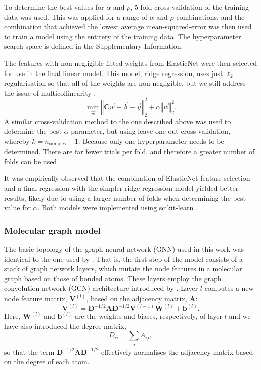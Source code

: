 To determine the best values for $\alpha$ and $\rho$, 5-fold cross-validation of
the training data was used. This was applied for a range of $\alpha$ and $\rho$
combinations, and the combination that achieved the lowest average
mean-squared-error was then used to train a model using the entirety of the
training data. The hyperparameter search space is defined in the Supplementary
Information.

The features with non-negligible fitted weights from ElasticNet were then selected for use in the final linear model. This model, ridge regression, uses just $\ell_2$ regularisation so that all of the weights are non-negligible, but we
still address the issue of multicollinearity \cite{mcdonaldRidgeRegression2009}:
\begin{equation}
    \min_{\vec{w}} \left \Vert \mathbf{C} \vec{w} + \vec{b} - \vec{y} \right \Vert_2^2 + \alpha \left \Vert \vec{w}\right \Vert_2^2.
\end{equation}
A similar cross-validation method to the one described above was used to determine the best $\alpha$ parameter, but using leave-one-out cross-validation, whereby $k=n_\text{samples}-1$. Because only one hyperparameter needs to be determined. There are far fewer trials per
fold, and therefore a greater number of folds can be used.

It was empirically observed that the combination of ElasticNet feature selection and a final regression with the simpler ridge regression model yielded better results, likely due to using a larger number of folds when determining the best value for $\alpha$. Both models were implemented using scikit-learn \cite{pedregosaScikitlearnMachineLearning2011}.

\subsubsection{Molecular graph model}

The basic topology of the graph neural network (GNN) used in this work was identical to the one used by \citet{qinPredictingCriticalMicelle2021}. That is, the first step of the model consists of a stack of graph network layers, which mutate the node features in a molecular graph based on those of bonded atoms.
These layers employ the graph convolution network (GCN) architecture introduced by \cite{kipfSemiSupervisedClassificationGraph2017}. Layer $l$ computes a new node feature matrix, $\mathbf{V}^{(l)}$, based on the adjacency matrix, $\mathbf{A}$:
\begin{equation}
    \mathbf{V}^{(l)} = \mathbf{D}^{-1/2} \mathbf{A} \mathbf{D}^{-1/2} \mathbf{V}^{(l-1)} \mathbf{W}^{(l)} + \mathbf{b}^{(l)}.
\end{equation}
Here, $\mathbf{W}^{(l)}$ and $\mathbf{b}^{(l)}$ are the weights and biases,
respectively, of layer $l$ and we have also introduced the degree matrix,
\begin{equation}
    D_{ii} = \sum_j A_{ij},
\end{equation}
so that the term $\mathbf{D}^{-1/2} \mathbf{A}
    \mathbf{D}^{-1/2}$ effectively normalises the adjacency matrix based on
the degree of each atom.

